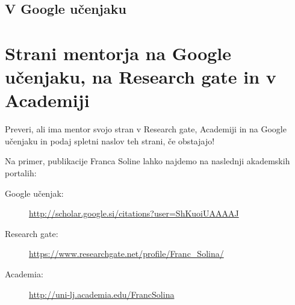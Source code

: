 \documentclass[11pt,a4paper]{article}
\begin{document}
\subsection{V Google učenjaku}


\section{Strani mentorja na Google učenjaku, na Research gate in v  Academiji}

Preveri, ali ima mentor svojo stran v Research gate, Academiji in na Google učenjaku in podaj spletni naslov teh strani, če obstajajo!


Na primer, publikacije Franca Soline lahko najdemo na naslednji akademskih portalih:
\begin{description}
\item[Google učenjak:] \url{http://scholar.google.si/citations?user=ShKuoiUAAAAJ}

\item[Research gate:] \url{https://www.researchgate.net/profile/Franc_Solina/}

\item[Academia:] \url{http://uni-lj.academia.edu/FrancSolina}

\end{description}



\end{document}
